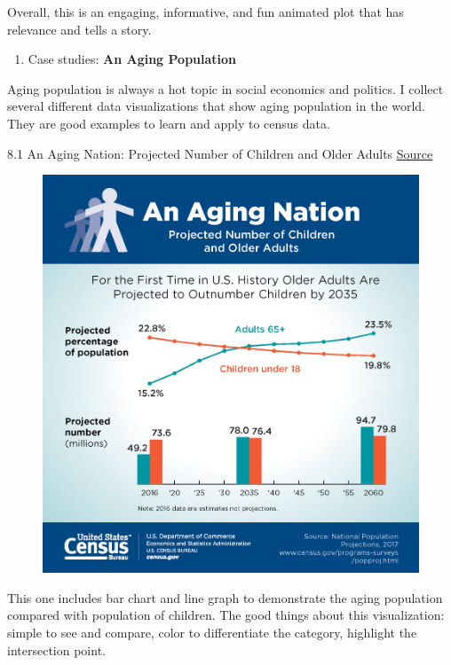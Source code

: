 \documentclass[]{book}
\providecommand{\tightlist}{%
  \setlength{\itemsep}{0pt}\setlength{\parskip}{0pt}}
\theoremstyle{definition}
\theoremstyle{definition}
\theoremstyle{definition}
\theoremstyle{remark}
\begin{document}
Overall, this is an engaging, informative, and fun animated plot that
has relevance and tells a story.

\begin{enumerate}
\def\labelenumi{\arabic{enumi}.}
\setcounter{enumi}{7}
\tightlist
\item
  Case studies: \textbf{An Aging Population}
\end{enumerate}

Aging population is always a hot topic in social economics and politics.
I collect several different data visualizations that show aging
population in the world. They are good examples to learn and apply to
census data.

8.1 An Aging Nation: Projected Number of Children and Older Adults
\href{https://www.census.gov/library/visualizations/2018/comm/historic-first.html}{Source}

\begin{figure}
\centering
\includegraphics{images/aging_nation.jpg}
\caption{}
\end{figure}

This one includes bar chart and line graph to demonstrate the aging
population compared with population of children. The good things about
this visualization: simple to see and compare, color to differentiate
the category, highlight the intersection point.
\end{document}

